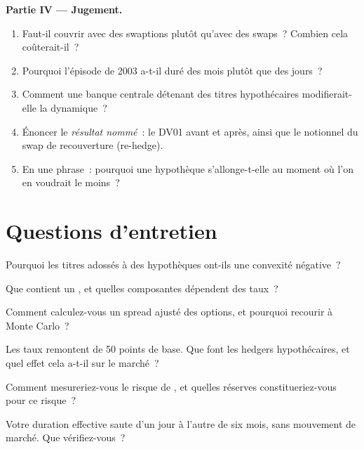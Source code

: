 \begin{problem}
\medskip\noindent\textbf{Partie IV --- Jugement.}
\begin{enumerate}[resume]
\item Faut-il couvrir avec des swaptions plutôt qu'avec des swaps~? Combien cela coûterait-il~?
\item Pourquoi l'épisode de 2003 a-t-il duré des mois plutôt que des jours~?
\item Comment une banque centrale détenant des titres hypothécaires modifierait-elle la dynamique~?
\item Énoncer le \emph{résultat nommé}~: le DV01 avant et après, ainsi que le notionnel du swap de
recouverture (re-hedge).
\item En une phrase~: pourquoi une hypothèque s'allonge-t-elle au moment où l'on en voudrait le moins~?
\end{enumerate}
\end{problem}

\section{Questions d'entretien}

\begin{interviewq}\label{iq:rc:mortgage-modelling:1}
Pourquoi les titres adossés à des hypothèques ont-ils une convexité négative~?
\end{interviewq}

\begin{interviewq}\label{iq:rc:mortgage-modelling:2}
Que contient un , et quelles composantes dépendent des taux~?
\end{interviewq}

\begin{interviewq}\label{iq:rc:mortgage-modelling:3}
Comment calculez-vous un spread ajusté des options, et pourquoi recourir à Monte Carlo~?
\end{interviewq}

\begin{interviewq}\label{iq:rc:mortgage-modelling:4}
Les taux remontent de 50 points de base. Que font les hedgers hypothécaires, et quel effet cela a-t-il sur le
marché~?
\end{interviewq}

\begin{interviewq}\label{iq:rc:mortgage-modelling:5}
Comment mesureriez-vous le risque de , et quelles réserves constitueriez-vous pour ce risque~?
\end{interviewq}

\begin{interviewq}\label{iq:rc:mortgage-modelling:6}
Votre duration effective saute d'un jour à l'autre de six mois, sans mouvement de marché. Que
vérifiez-vous~?
\end{interviewq}
